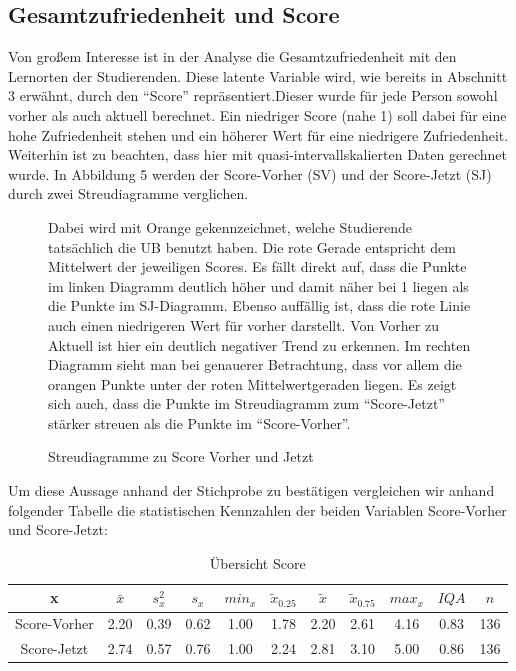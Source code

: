 \documentclass[11pt, a4paper]{article}
\begin{document}
\subsection{Gesamtzufriedenheit und Score}



Von großem Interesse ist in der Analyse die Gesamtzufriedenheit mit den Lernorten der Studierenden.
Diese latente Variable wird, wie bereits in Abschnitt 3 erwähnt, durch den “Score” repräsentiert.Dieser wurde für jede Person sowohl vorher als auch aktuell berechnet.
Ein niedriger Score (nahe 1) soll dabei für eine hohe Zufriedenheit stehen und ein höherer Wert für eine niedrigere Zufriedenheit.\\
Weiterhin ist zu beachten, dass hier mit quasi-intervallskalierten Daten gerechnet wurde.
In Abbildung 5 werden der Score-Vorher (SV) und der Score-Jetzt (SJ) durch zwei Streudiagramme verglichen.

\vspace{-0.5cm}
\begin{figure}[h]

\vspace{-1.8cm}
\caption{Streudiagramme zu Score Vorher und Jetzt}
\vspace{1cm}
Dabei wird mit Orange gekennzeichnet, welche Studierende tatsächlich die UB benutzt haben. Die rote Gerade entspricht dem Mittelwert der jeweiligen Scores.
Es fällt direkt auf, dass die Punkte im linken Diagramm deutlich höher und damit näher bei 1 liegen als die Punkte im SJ-Diagramm.
Ebenso auffällig ist, dass die rote Linie auch einen niedrigeren Wert für vorher darstellt.
Von Vorher zu Aktuell ist hier ein deutlich negativer Trend zu erkennen.
Im rechten Diagramm sieht man bei genauerer Betrachtung, dass vor allem die orangen Punkte unter der roten Mittelwertgeraden liegen.
Es zeigt sich auch, dass die Punkte im Streudiagramm zum “Score-Jetzt” stärker streuen als die Punkte im “Score-Vorher”.


\end{figure}
\newpage
Um diese Aussage anhand der Stichprobe zu bestätigen vergleichen wir anhand folgender Tabelle die statistischen Kennzahlen der beiden Variablen Score-Vorher und Score-Jetzt: 



\begin{table}[h]
	\begin{center}
	\vspace{0.2cm}
	\begin{tabular}{c|ccccccccc|c}
		x & $\bar{x}$ & $s_x^2$ & $s_x$ & $min_x$ & $\tilde{x}_{0.25}$ & $\tilde{x}$ & $\tilde{x}_{0.75}$ & $max_x$ & $IQA$ & $n$ \\ \hline
		Score-Vorher & 2.20 & 0.39 & 0.62 & 1.00 & 1.78 & 2.20 & 2.61 & 4.16 & 0.83 & 136 \\
		Score-Jetzt & 2.74 & 0.57 & 0.76 & 1.00 & 2.24 & 2.81 & 3.10 & 5.00 & 0.86 & 136
	\end{tabular}
	\vspace{0.2cm}
	\caption{Übersicht Score}
\end{center}
\end{table}
\end{document}
